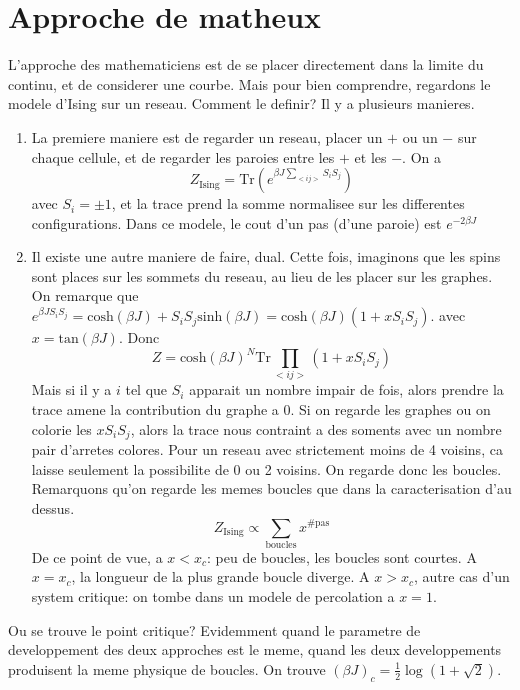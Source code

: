 \documentclass[a4paper]{book}
\theoremstyle{definition}
\theoremstyle{remark}
\begin{document}
\chapter{Approche de matheux}
L'approche des mathematiciens est de se placer directement dans la limite du continu, et de considerer une courbe. Mais pour bien comprendre, regardons le modele d'Ising sur un reseau. Comment le definir? Il y a plusieurs manieres. 
\begin{enumerate}
    \item La premiere maniere est de regarder un reseau, placer un $+$ ou un $-$ sur chaque cellule, et de regarder les paroies entre les $+$ et les $-$. On a 
    \begin{equation}
        Z_{\text{Ising}} = \text{Tr}(e^{\beta J \sum_{<ij>}S_i S_j})
    \end{equation}
    avec $S_i = \pm 1$, et la trace prend la somme normalisee sur les differentes configurations. Dans ce modele, le cout d'un pas (d'une paroie) est $e^{-2\beta J}$
    \item Il existe une autre maniere de faire, dual. Cette fois, imaginons que les spins sont places sur les sommets du reseau, au lieu de les placer sur les graphes. On remarque que $e^{\beta J S_iS_j} = \text{cosh}(\beta J) + S_i S_j \text{sinh}(\beta J) = \text{cosh}(\beta J) ( 1 + xS_iS_j)$. avec $x = \text{tan}(\beta J)$. Donc 
    \begin{equation}
        Z = \text{cosh}(\beta J)^N \text{Tr} \prod_{<ij>} (1 + x S_iS_j)
    \end{equation}
    Mais si il y a $i$ tel que $S_i$ apparait un nombre impair de fois, alors prendre la trace amene la contribution du graphe a 0. Si on regarde les graphes ou on colorie les $xS_iS_j$, alors la trace nous contraint a des soments avec un nombre pair d'arretes colores. Pour un reseau avec strictement moins de 4 voisins, ca laisse seulement la possibilite de 0 ou 2 voisins. On regarde donc les boucles. Remarquons qu'on regarde les memes boucles que dans la caracterisation d'au dessus. 
    \begin{equation}
        Z_{\text{Ising}} \propto \sum_{\text{boucles}} x^{\#\text{pas}}
    \end{equation}
    De ce point de vue, a $x<x_c$: peu de boucles, les boucles sont courtes. A $x = x_c$, la longueur de la plus grande boucle diverge. A $x > x_c$, autre cas d'un system critique: on tombe dans un modele de percolation a $x=1$. 
\end{enumerate}
Ou se trouve le point critique? Evidemment quand le parametre de developpement des deux approches est le meme, quand les deux developpements produisent la meme physique de boucles. On trouve $(\beta J)_c = \frac{1}{2}\log (1+\sqrt 2)$. \par \medskip 
\end{document}
